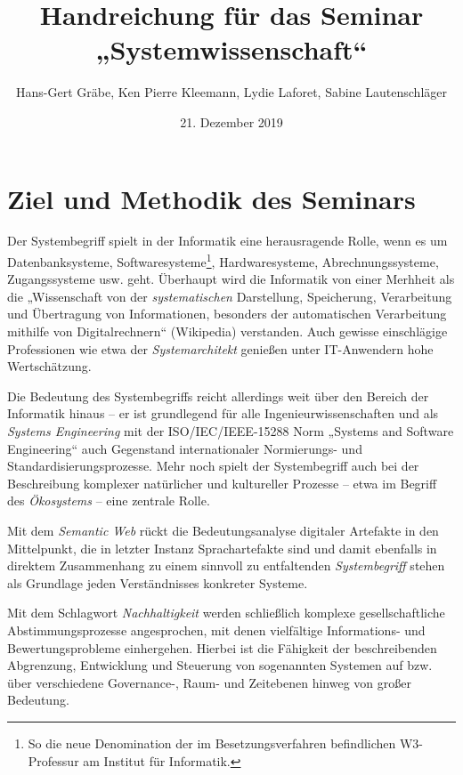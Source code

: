 \documentclass[11pt,a4paper]{article}
\title{Handreichung für das Seminar „Systemwissenschaft“}
\author{Hans-Gert Gr\"abe, Ken Pierre Kleemann, Lydie Laforet, Sabine
  Lautenschläger}
\date{21. Dezember 2019}
\begin{document}
\maketitle

\section{Ziel und Methodik des Seminars}

Der Systembegriff spielt in der Informatik eine herausragende Rolle, wenn es
um Datenbanksysteme, Softwaresysteme\footnote{So die neue Denomination der im
  Besetzungsverfahren befindlichen W3-Professur am Institut für Informatik.},
Hardwaresysteme, Abrechnungssysteme, Zugangssysteme usw. geht.  Überhaupt wird
die Informatik von einer Merhheit als die „Wissenschaft von der
\emph{systematischen} Darstellung, Speicherung, Verarbeitung und Übertragung
von Informationen, besonders der automatischen Verarbeitung mithilfe von
Digitalrechnern“ (Wikipedia) verstanden.  Auch gewisse einschlägige
Professionen wie etwa der \emph{Systemarchitekt} genießen unter IT-Anwendern
hohe Wertschätzung.

Die Bedeutung des Systembegriffs reicht allerdings weit über den Bereich der
Informatik hinaus -- er ist grundlegend für alle Ingenieurwissenschaften und
als \emph{Systems Engineering} mit der ISO/IEC/IEEE-15288 Norm „Systems and
Software Engineering“ auch Gegenstand internationaler Normierungs- und
Standardisierungsprozesse.  Mehr noch spielt der Systembegriff auch bei der
Beschreibung komplexer natürlicher und kultureller Prozesse -- etwa im Begriff
des \emph{Ökosystems} -- eine zentrale Rolle.

Mit dem \emph{Semantic Web} rückt die Bedeutungsanalyse digitaler Artefakte in
den Mittelpunkt, die in letzter Instanz Sprachartefakte sind und damit
ebenfalls in direktem Zusammenhang zu einem sinnvoll zu entfaltenden
\emph{Systembegriff} stehen als Grundlage jeden Verständnisses konkreter
Systeme.

Mit dem Schlagwort \emph{Nachhaltigkeit} werden schließlich komplexe
gesellschaftliche Abstimmungsprozesse angesprochen, mit denen vielfältige
Informations- und Bewertungsprobleme einhergehen. Hierbei ist die Fähigkeit
der beschreibenden Abgrenzung, Entwicklung und Steuerung von sogenannten
Systemen auf bzw. über verschiedene Governance-, Raum- und Zeitebenen hinweg
von großer Bedeutung.
\end{document}
